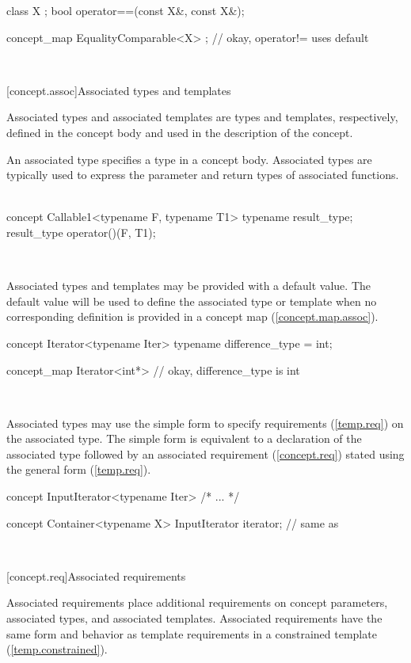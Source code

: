 \documentclass[american]{book}
\begin{document}
\begin{paras}
\begin{codeblock}
class X {};
bool operator==(const X&, const X&);

concept_map EqualityComparable<X> { }; // okay, operator!= uses default
\end{codeblock}
\exitexample\

[concept.assoc]{Associated types and templates}

\pnum
Associated types and associated templates are types and templates,
respectively, defined in the concept body and used in the
description of the concept. 

\pnum
An associated type specifies a type in a concept
body. Associated types are typically used to express the parameter and
return types of associated functions. \enterexample\
\begin{codeblock}
concept Callable1<typename F, typename T1> {
  typename result_type;
  result_type operator()(F, T1);
}
\end{codeblock}
\exitexample\

\pnum
Associated types and templates may be provided with a default value. The
default value will be used to define the associated type or template when no
corresponding definition is provided in a concept map
(\ref{concept.map.assoc}). \enterexample\
\begin{codeblock}
concept Iterator<typename Iter> {
  typename difference_type = int;
}

concept_map Iterator<int*> { } // okay, difference_type is int
\end{codeblock}
\exitexample\

\pnum
Associated types may use the simple form to
specify requirements 
(\ref{temp.req}) on the associated type. The simple
form is equivalent to a declaration of the associated type
followed by an associated requirement (\ref{concept.req}) stated using
the general form (\ref{temp.req}). \enterexample\
\begin{codeblock}
concept InputIterator<typename Iter> { /* ... */ }

concept Container<typename X> {
  InputIterator iterator; // same as 
}
\end{codeblock}
\exitexample\

[concept.req]{Associated requirements}

\pnum
Associated requirements place additional requirements on concept
parameters, associated types, and associated templates. Associated
requirements have the
same form and behavior as template requirements in a constrained
template (\ref{temp.constrained}).


\end{paras}
\end{document}
